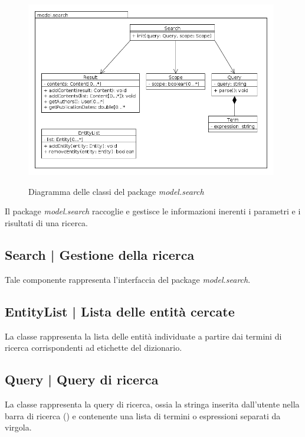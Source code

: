 \documentclass[10pt,a4paper,headinclude,footinclude,hidelinks]{scrreprt} %
\begin{document}
	\begin{figure}[ht]
		\begin{center}
	    	\includegraphics[width=11cm]{class/model_search.png}
			\label{gfx:class:model:search}
			\caption{Diagramma delle classi del package \textit{model.search}}
		\end{center}
	\end{figure}

	Il package \textit{model.search} raccoglie e gestisce le informazioni inerenti i parametri e i risultati di una ricerca. 

	\subsection[Search]{Search | Gestione della ricerca}
	\label{sec:stage:design:model.search:search}
	Tale componente rappresenta l'interfaccia del package \textit{model.search}.

	\subsection[EntityList]{EntityList | Lista delle entità cercate}
	\label{sec:stage:design:model.search:search-entity-list}
	La classe \textit{} rappresenta la lista delle entità individuate a partire dai termini di ricerca corrispondenti ad etichette del dizionario.

	\subsection[Query]{Query | Query di ricerca}
	\label{sec:stage:design:model.search:search-query}
	La classe \textit{} rappresenta la query di ricerca, ossia la stringa inserita dall'utente nella barra di ricerca (\textit{}) e contenente una lista di termini o espressioni separati da virgola.
\end{document}
